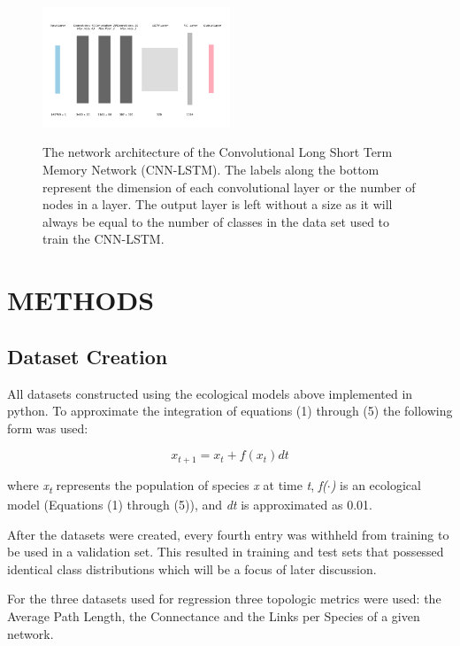\documentclass[letterpaper, 10 pt, conference]{ieeeconf}  %
\begin{document}
\begin{figure}
	\centering
    {\label{ref_label2}\includegraphics[width=0.5\textwidth]{cnn_lstm.png}}
    \caption{\label{ref_label_overall}The network architecture of the Convolutional Long Short Term Memory Network (CNN-LSTM). The labels along the bottom represent the dimension of each convolutional layer or the number of nodes in a layer. The output layer is left without a size as it will always be equal to the number of classes in the data set used to train the CNN-LSTM.}
\end{figure} 

\section{METHODS}
\subsection{Dataset Creation}
	All datasets constructed using the ecological models above implemented in python. To approximate the integration of equations (1) through (5) the following form was used:
	
    \begin{equation}x_{t+1} = x_{t} + f(x_{t})dt\end{equation}
    
    where \textit{x\textsubscript{t}} represents the population of species \textit{x} at time \textit{t}, \textit{f($\cdot$)} is an ecological model (Equations (1) through (5)), and \textit{dt} is approximated as 0.01. 
	
    After the datasets were created, every fourth entry was withheld from training to be used in a validation set. This resulted in training and test sets that possessed identical class distributions which will be a focus of later discussion.
    
    For the three datasets used for regression three topologic metrics were used: the Average Path Length, the Connectance and the Links per Species of a given network.
    
\end{document}
